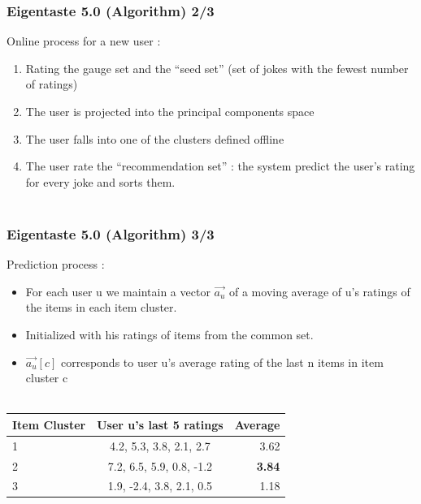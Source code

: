 \documentclass[10pt,handout,english]{beamer}
\begin{document}
			\begin{frame}
			\frametitle{Eigentaste 5.0 (Algorithm) 2/3}
				Online process for a new user :
				\begin{enumerate}
					\item Rating the gauge set and the ``seed set'' (set of jokes with the fewest number of ratings)
					\item The user is projected into the principal components space
					\item The user falls into one of the clusters defined offline
					\item The user rate the ``recommendation set'' : the system predict the user’s rating for every joke and sorts them.\\~\\
				\end{enumerate}

			\end{frame}

			\begin{frame}
			\frametitle{Eigentaste 5.0 (Algorithm) 3/3}
				Prediction process :
				\begin{itemize}
					\item For each user u we maintain a vector $\overrightarrow{a_u}$ of a moving average of u's ratings of the items in each item cluster.
					\item Initialized with his ratings of items from the common set.
					\item $\overrightarrow{a_u}[c]$ corresponds to user u's average rating of the last n items in item cluster c\\~\\
				\end{itemize}
				\begin{tabular}{|l|c|r|}
					\hline
					Item Cluster & User u's last 5 ratings & Average \\
					\hline
					1 & 4.2, 5.3, 3.8, 2.1, 2.7 & 3.62 \\
					2 & 7.2, 6.5, 5.9, 0.8, -1.2 & \textbf{3.84} \\
					3 & 1.9, -2.4, 3.8, 2.1, 0.5 & 1.18 \\
					\hline
				\end{tabular}
			\end{frame}
\end{document}
